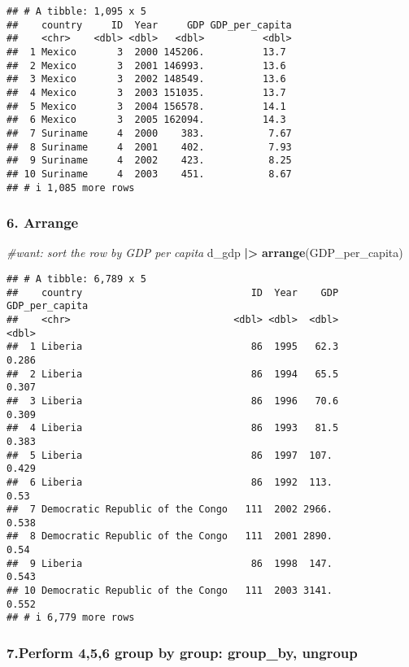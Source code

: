 \documentclass[
]{article}
\newenvironment{Shaded}{\begin{snugshade}}{\end{snugshade}}
\newcommand{\CommentTok}[1]{\textcolor[rgb]{0.56,0.35,0.01}{\textit{#1}}}
\newcommand{\FunctionTok}[1]{\textcolor[rgb]{0.13,0.29,0.53}{\textbf{#1}}}
\newcommand{\NormalTok}[1]{#1}
\newcommand{\SpecialCharTok}[1]{\textcolor[rgb]{0.81,0.36,0.00}{\textbf{#1}}}
\begin{document}
\begin{verbatim}
## # A tibble: 1,095 x 5
##    country     ID  Year     GDP GDP_per_capita
##    <chr>    <dbl> <dbl>   <dbl>          <dbl>
##  1 Mexico       3  2000 145206.          13.7 
##  2 Mexico       3  2001 146993.          13.6 
##  3 Mexico       3  2002 148549.          13.6 
##  4 Mexico       3  2003 151035.          13.7 
##  5 Mexico       3  2004 156578.          14.1 
##  6 Mexico       3  2005 162094.          14.3 
##  7 Suriname     4  2000    383.           7.67
##  8 Suriname     4  2001    402.           7.93
##  9 Suriname     4  2002    423.           8.25
## 10 Suriname     4  2003    451.           8.67
## # i 1,085 more rows
\end{verbatim}

\hypertarget{arrange}{%
\subsubsection{6. Arrange}\label{arrange}}

\begin{Shaded}
\begin{Highlighting}[]
\CommentTok{\#want: sort the row by GDP per capita}
\NormalTok{d\_gdp }\SpecialCharTok{|\textgreater{}} \FunctionTok{arrange}\NormalTok{(GDP\_per\_capita)}
\end{Highlighting}
\end{Shaded}

\begin{verbatim}
## # A tibble: 6,789 x 5
##    country                             ID  Year    GDP GDP_per_capita
##    <chr>                            <dbl> <dbl>  <dbl>          <dbl>
##  1 Liberia                             86  1995   62.3          0.286
##  2 Liberia                             86  1994   65.5          0.307
##  3 Liberia                             86  1996   70.6          0.309
##  4 Liberia                             86  1993   81.5          0.383
##  5 Liberia                             86  1997  107.           0.429
##  6 Liberia                             86  1992  113.           0.53 
##  7 Democratic Republic of the Congo   111  2002 2966.           0.538
##  8 Democratic Republic of the Congo   111  2001 2890.           0.54 
##  9 Liberia                             86  1998  147.           0.543
## 10 Democratic Republic of the Congo   111  2003 3141.           0.552
## # i 6,779 more rows
\end{verbatim}

\hypertarget{perform-456-group-by-group-group_by-ungroup}{%
\subsubsection{7.Perform 4,5,6 group by group: group\_by,
ungroup}\label{perform-456-group-by-group-group_by-ungroup}}
\end{document}
